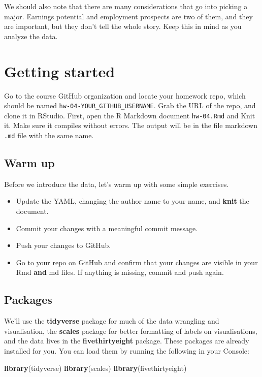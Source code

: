\documentclass[
]{article}
\newenvironment{Shaded}{\begin{snugshade}}{\end{snugshade}}
\newcommand{\FunctionTok}[1]{\textcolor[rgb]{0.13,0.29,0.53}{\textbf{#1}}}
\newcommand{\NormalTok}[1]{#1}
\providecommand{\tightlist}{%
  \setlength{\itemsep}{0pt}\setlength{\parskip}{0pt}}
\begin{document}
We should also note that there are many considerations that go into
picking a major. Earnings potential and employment prospects are two of
them, and they are important, but they don't tell the whole story. Keep
this in mind as you analyze the data.

\section{Getting started}\label{getting-started}

Go to the course GitHub organization and locate your homework repo,
which should be named \texttt{hw-04-YOUR\_GITHUB\_USERNAME}. Grab the
URL of the repo, and clone it in RStudio. First, open the R Markdown
document \texttt{hw-04.Rmd} and Knit it. Make sure it compiles without
errors. The output will be in the file markdown \texttt{.md} file with
the same name.

\subsection{Warm up}\label{warm-up}

Before we introduce the data, let's warm up with some simple exercises.

\begin{itemize}
\tightlist
\item
  Update the YAML, changing the author name to your name, and
  \textbf{knit} the document.
\item
  Commit your changes with a meaningful commit message.
\item
  Push your changes to GitHub.
\item
  Go to your repo on GitHub and confirm that your changes are visible in
  your Rmd \textbf{and} md files. If anything is missing, commit and
  push again.
\end{itemize}

\subsection{Packages}\label{packages}

We'll use the \textbf{tidyverse} package for much of the data wrangling
and visualisation, the \textbf{scales} package for better formatting of
labels on visualisations, and the data lives in the
\textbf{fivethirtyeight} package. These packages are already installed
for you. You can load them by running the following in your Console:

\begin{Shaded}
\begin{Highlighting}[]
\FunctionTok{library}\NormalTok{(tidyverse)}
\FunctionTok{library}\NormalTok{(scales)}
\FunctionTok{library}\NormalTok{(fivethirtyeight)}
\end{Highlighting}
\end{Shaded}
\end{document}
